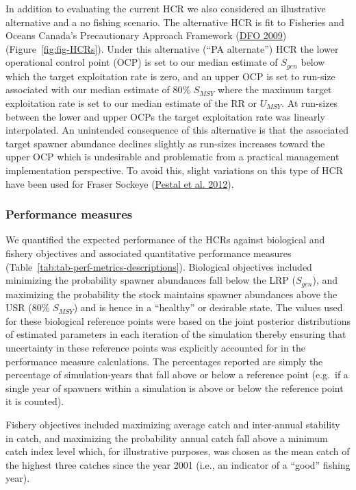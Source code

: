 \documentclass[11pt]{book}
\begin{document}
In addition to evaluating the current HCR we also considered an illustrative alternative and a no fishing scenario. The alternative HCR is fit to Fisheries and Oceans Canada's Precautionary Approach Framework (\protect\hyperlink{ref-dfoFisheryDecisionmakingFramework2009}{DFO 2009}) (Figure~\ref{fig:fig-HCRs}). Under this alternative (``PA alternate'') HCR the lower operational control point (OCP) is set to our median estimate of \(S_{gen}\) below which the target exploitation rate is zero, and an upper OCP is set to run-size associated with our median estimate of 80\% \(S_{MSY}\) where the maximum target exploitation rate is set to our median estimate of the RR or \(U_{MSY}\). At run-sizes between the lower and upper OCPs the target exploitation rate was linearly interpolated. An unintended consequence of this alternative is that the associated target spawner abundance declines slightly as run-sizes increases toward the upper OCP which is undesirable and problematic from a practical management implementation perspective. To avoid this, slight variations on this type of HCR have been used for Fraser Sockeye (\protect\hyperlink{ref-pestalUpdatedMethodsAssessing2012}{Pestal et al. 2012}).

\hypertarget{performance-measures}{%
\subsubsection{Performance measures}\label{performance-measures}}

We quantified the expected performance of the HCRs against biological and fishery objectives and associated quantitative performance measures (Table~\ref{tab:tab-perf-metrics-descriptions}). Biological objectives included minimizing the probability spawner abundances fall below the LRP (\(S_{gen}\)), and maximizing the probability the stock maintains spawner abundances above the USR (80\% \(S_{MSY}\)) and is hence in a ``healthy'' or desirable state. The values used for these biological reference points were based on the joint posterior distributions of estimated parameters in each iteration of the simulation thereby ensuring that uncertainty in these reference points was explicitly accounted for in the performance measure calculations. The percentages reported are simply the percentage of simulation-years that fall above or below a reference point (e.g.~if a single year of spawners within a simulation is above or below the reference point it is counted).

Fishery objectives included maximizing average catch and inter-annual stability in catch, and maximizing the probability annual catch fall above a minimum catch index level which, for illustrative purposes, was chosen as the mean catch of the highest three catches since the year 2001 (i.e., an indicator of a ``good'' fishing year).
\end{document}
